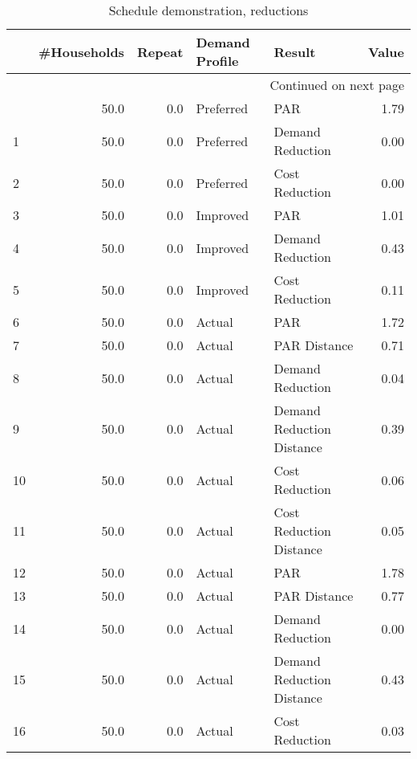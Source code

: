 \begin{longtable}{lrrllr}
\caption{Schedule demonstration, reductions}\label{tab:multiple:exp:demon}\\
\toprule
{} &  \#Households &  Repeat & Demand Profile &                     Result &  Value \\
\midrule
\endhead
\midrule
\multicolumn{6}{r}{{Continued on next page}} \\
\midrule
\endfoot

\bottomrule
\endlastfoot
0    &         50.0 &     0.0 &      Preferred &                        PAR &   1.79 \\
1    &         50.0 &     0.0 &      Preferred &           Demand Reduction &   0.00 \\
2    &         50.0 &     0.0 &      Preferred &             Cost Reduction &   0.00 \\
3    &         50.0 &     0.0 &       Improved &                        PAR &   1.01 \\
4    &         50.0 &     0.0 &       Improved &           Demand Reduction &   0.43 \\
5    &         50.0 &     0.0 &       Improved &             Cost Reduction &   0.11 \\
6    &         50.0 &     0.0 &         Actual &                        PAR &   1.72 \\
7    &         50.0 &     0.0 &         Actual &               PAR Distance &   0.71 \\
8    &         50.0 &     0.0 &         Actual &           Demand Reduction &   0.04 \\
9    &         50.0 &     0.0 &         Actual &  Demand Reduction Distance &   0.39 \\
10   &         50.0 &     0.0 &         Actual &             Cost Reduction &   0.06 \\
11   &         50.0 &     0.0 &         Actual &    Cost Reduction Distance &   0.05 \\
12   &         50.0 &     0.0 &         Actual &                        PAR &   1.78 \\
13   &         50.0 &     0.0 &         Actual &               PAR Distance &   0.77 \\
14   &         50.0 &     0.0 &         Actual &           Demand Reduction &   0.00 \\
15   &         50.0 &     0.0 &         Actual &  Demand Reduction Distance &   0.43 \\
16   &         50.0 &     0.0 &         Actual &             Cost Reduction &   0.03 \\

\end{longtable}
